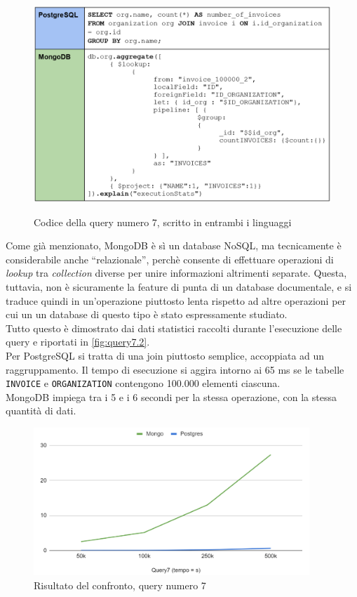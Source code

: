 \begin{figure}[htbp]
\begin{center}
\includegraphics[height=22em]{immagini/query/query7.png}
\caption{Codice della query numero 7, scritto in entrambi i linguaggi}
\label{fig:query7}
\end{center}
\end{figure}

\noindent Come già menzionato, MongoDB è sì un database NoSQL, ma tecnicamente è considerabile anche ``relazionale'', perchè consente di effettuare operazioni di \textit{lookup} tra \textit{collection} diverse per unire informazioni altrimenti separate. Questa, tuttavia, non è sicuramente la feature di punta di un database documentale, e si traduce quindi in un'operazione piuttosto lenta rispetto ad altre operazioni per cui un un database di questo tipo è stato espressamente studiato.\\

\noindent Tutto questo è dimostrato dai dati statistici raccolti durante l'esecuzione delle query e riportati in \autoref{fig:query7.2}.\\
Per PostgreSQL si tratta di una join piuttosto semplice, accoppiata ad un raggruppamento. Il tempo di esecuzione si aggira intorno ai 65 ms se le tabelle \texttt{INVOICE} e \texttt{ORGANIZATION} contengono 100.000 elementi ciascuna.\\
MongoDB impiega tra i 5 e i 6 secondi per la stessa operazione, con la stessa quantità di dati.

\begin{figure}[htbp]
\begin{center}
\includegraphics[height=15em]{immagini/query/query7_results.png}
\caption{Risultato del confronto, query numero 7}
\label{fig:query7.2}
\end{center}
\end{figure}

